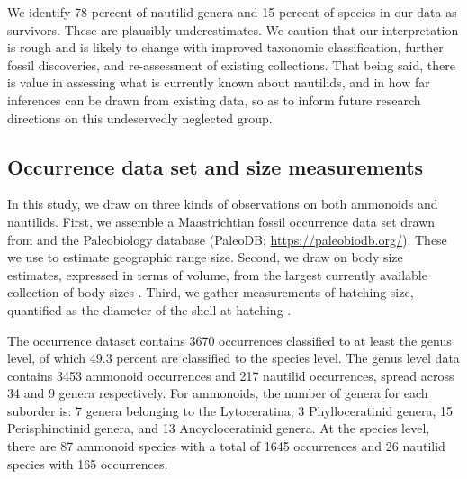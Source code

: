 \documentclass[a4paper]{article}
\begin{document}
We identify 78 percent of nautilid genera and 15 percent of species in our data as survivors. These are plausibly underestimates.
We caution that our interpretation is rough and is likely to change with improved taxonomic classification, further fossil discoveries, and re-assessment of existing collections. That being said, there is value in assessing what is currently known about nautilids, and in how far inferences can be drawn from existing data, so as to inform future research directions on this undeservedly neglected group. 
 
\subsection*{Occurrence data set and size measurements}

In this study, we draw on three kinds of observations on both ammonoids and nautilids. First, we assemble a Maastrichtian fossil occurrence data set drawn from \textcite{flannery-sutherlandLateCretaceousAmmonoids2024} and the Paleobiology database (PaleoDB; \url{https://paleobiodb.org/}). These we use to estimate geographic range size. Second, we draw on body size estimates, expressed in terms of volume, from the largest currently available collection of body sizes \parencite{payneBodySizeSampling2020, heimCopesRuleEvolution2015}. Third, we gather measurements of hatching size, quantified as the diameter of the shell at hatching \parencite{cichowolskiNautiloidGenusCymatoceras2003, landmanNautilidNurseriesHatchlings2018, malchykShellOrnamentSystematic2017, tajikaIntraInterspecificVariability2022, debaetsAmmonoidEmbryonicDevelopment2015, laptikhovskyEnvironmentalImpactEctocochleate2013, shigetaNewSpeciesTetragonites2024,  takaiConservativeOntogeneticTrajectories2022}. 

The occurrence dataset contains 3670 occurrences classified to at least the genus level, of which 49.3 percent are classified to the species level. The genus level data contains 3453 ammonoid occurrences and 217 nautilid occurrences, spread across 34 and 9 genera respectively. For ammonoids, the number of genera for each suborder is: 7 genera belonging to the Lytoceratina, 3 Phylloceratinid genera, 15 Perisphinctinid genera, and 13 Ancycloceratinid genera. At the species level, there are 87 ammonoid species with a total of 1645 occurrences and 26 nautilid species with 165 occurrences. 
\end{document}
